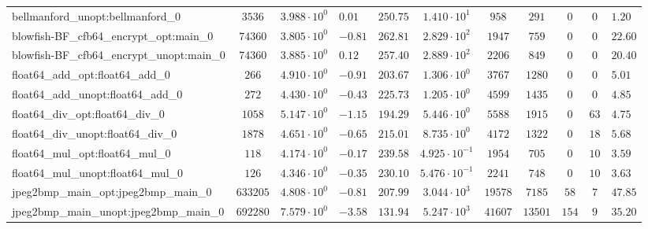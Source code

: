 \begin{tabular}{|l|c|HHc|c|c|c|c|cH|}
bellmanford\_unopt:bellmanford\_0               & $ 3536     $ & $ 3.988 \cdot 10^{0} $ & $ 0.01  $ & $ 250.75 $ & $ 1.410 \cdot 10^{1}  $ & $ 958    $ & $ 291   $ & $ 0   $ & $ 0   $ & $ 1.20    $ \\
blowfish-BF\_cfb64\_encrypt\_opt:main\_0        & $ 74360    $ & $ 3.805 \cdot 10^{0} $ & $ -0.81 $ & $ 262.81 $ & $ 2.829 \cdot 10^{2}  $ & $ 1947   $ & $ 759   $ & $ 0   $ & $ 0   $ & $ 22.60   $ \\
blowfish-BF\_cfb64\_encrypt\_unopt:main\_0      & $ 74360    $ & $ 3.885 \cdot 10^{0} $ & $ 0.12  $ & $ 257.40 $ & $ 2.889 \cdot 10^{2}  $ & $ 2206   $ & $ 849   $ & $ 0   $ & $ 0   $ & $ 20.40   $ \\
float64\_add\_opt:float64\_add\_0               & $ 266      $ & $ 4.910 \cdot 10^{0} $ & $ -0.91 $ & $ 203.67 $ & $ 1.306 \cdot 10^{0}  $ & $ 3767   $ & $ 1280  $ & $ 0   $ & $ 0   $ & $ 5.01    $ \\
float64\_add\_unopt:float64\_add\_0             & $ 272      $ & $ 4.430 \cdot 10^{0} $ & $ -0.43 $ & $ 225.73 $ & $ 1.205 \cdot 10^{0}  $ & $ 4599   $ & $ 1435  $ & $ 0   $ & $ 0   $ & $ 4.85    $ \\
float64\_div\_opt:float64\_div\_0               & $ 1058     $ & $ 5.147 \cdot 10^{0} $ & $ -1.15 $ & $ 194.29 $ & $ 5.446 \cdot 10^{0}  $ & $ 5588   $ & $ 1915  $ & $ 0   $ & $ 63  $ & $ 4.75    $ \\
float64\_div\_unopt:float64\_div\_0             & $ 1878     $ & $ 4.651 \cdot 10^{0} $ & $ -0.65 $ & $ 215.01 $ & $ 8.735 \cdot 10^{0}  $ & $ 4172   $ & $ 1322  $ & $ 0   $ & $ 18  $ & $ 5.68    $ \\
float64\_mul\_opt:float64\_mul\_0               & $ 118      $ & $ 4.174 \cdot 10^{0} $ & $ -0.17 $ & $ 239.58 $ & $ 4.925 \cdot 10^{-1} $ & $ 1954   $ & $ 705   $ & $ 0   $ & $ 10  $ & $ 3.59    $ \\
float64\_mul\_unopt:float64\_mul\_0             & $ 126      $ & $ 4.346 \cdot 10^{0} $ & $ -0.35 $ & $ 230.10 $ & $ 5.476 \cdot 10^{-1} $ & $ 2241   $ & $ 748   $ & $ 0   $ & $ 10  $ & $ 3.63    $ \\
jpeg2bmp\_main\_opt:jpeg2bmp\_main\_0           & $ 633205   $ & $ 4.808 \cdot 10^{0} $ & $ -0.81 $ & $ 207.99 $ & $ 3.044 \cdot 10^{3}  $ & $ 19578  $ & $ 7185  $ & $ 58  $ & $ 7   $ & $ 47.85   $ \\
jpeg2bmp\_main\_unopt:jpeg2bmp\_main\_0         & $ 692280   $ & $ 7.579 \cdot 10^{0} $ & $ -3.58 $ & $ 131.94 $ & $ 5.247 \cdot 10^{3}  $ & $ 41607  $ & $ 13501 $ & $ 154 $ & $ 9   $ & $ 35.20   $ \\

\end{tabular}
